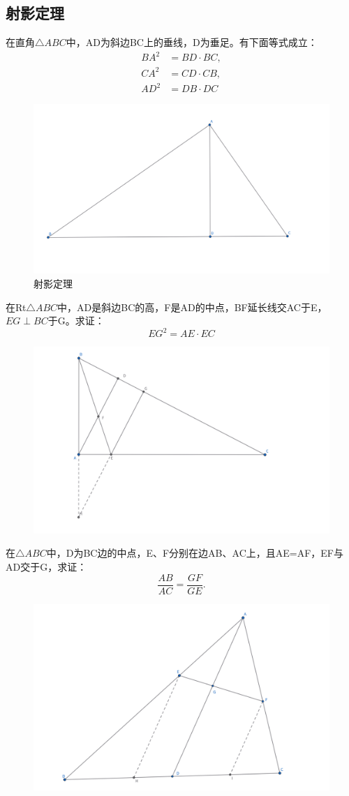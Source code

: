 \subsection{射影定理}
\begin{theorem}[射影定理]
    在直角$\triangle ABC$中，AD为斜边BC上的垂线，D为垂足。有下面等式成立：
    $$
    \begin{aligned}
    BA^2 &= BD\cdot BC,\\ 
    CA^2 &= CD\cdot CB,\\
    AD^2 &= DB\cdot DC
    \end{aligned}
    $$
\end{theorem}
\begin{figure}[H]
    \centering
    \includegraphics[width=0.8\linewidth]{figures/射影定理.png}
    \caption{射影定理}
\end{figure}

\begin{exercise}
    在Rt$\triangle ABC$中，AD是斜边BC的高，F是AD的中点，BF延长线交AC于E，$EG\perp BC$于G。求证：$$EG^2=AE\cdot EC$$
\end{exercise}

\begin{figure}[H]
    \centering
    \includegraphics[width=0.7\linewidth]{figures/exercises/001.png}
\end{figure}

\begin{exercise}
在$\triangle ABC$中，D为BC边的中点，E、F分别在边AB、AC上，且AE=AF，EF与AD交于G，求证：
$$\frac{AB}{AC}=\frac{GF}{GE}.$$
\end{exercise}

\begin{figure}[H]
    \centering
    \includegraphics[width=0.7\linewidth]{figures/exercises/002.png}
\end{figure}